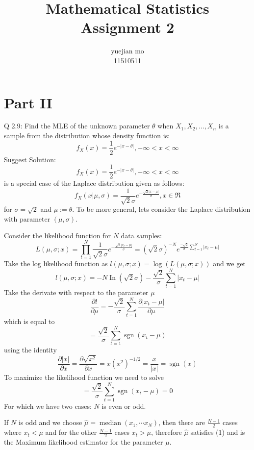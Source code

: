 \documentclass{article}
\newcommand{\assign}{:=}
\newcommand{\nobracket}{}
\newcommand{\tmaffiliation}[1]{\\ #1}
\newcommand{\tmop}[1]{\ensuremath{\operatorname{#1}}}
\begin{document}
\title{Mathematical Statistics Assignment 2}

\author{
  yuejian mo
  \tmaffiliation{11510511}
}

\maketitle

\section*{Part II}

Q 2.9: Find the MLE of the unknown parameter $\theta$ when $X_1, X_2, \ldots,
X_n$ is a sample from the distribution whose density function is:
\[ f_X (x) = \frac{1}{2} e^{- | x - \theta |}, - \infty < x < \infty \]
Suggest Solution:
\[ f_X (x) = \frac{1}{2} e^{- | x - \theta |}, - \infty < x < \infty \]
is a special case of the Laplace distribution given as follows:
\[ f_X (x | \mu, \sigma \nobracket) = \frac{1}{\sqrt{2} \sigma} e^{-
   \frac{\sqrt{2} | x - \mu |}{\sigma}}, x \in \Re \]
for $\sigma = \sqrt{2}$ and $\mu \assign \theta$. To be more general, lets
consider the Laplace distribution with parameter $(\mu, \sigma) .$

Consider the likelihood function for $N$ data samples:
\[ L (\mu, \sigma ; x) = \prod_{t = 1}^N \frac{1}{\sqrt{2} \sigma} e^{-
   \frac{\sqrt{2} | x_t - \mu |}{\sigma}} = \left( \sqrt{2} \sigma \right)^{-
   N} e^{\frac{- \sqrt{2}}{\sigma} \sum_{t = 1}^N | x_t - \mu |} \]
Take the log likelihood function as $l (\mu, \sigma ; x) = \log (L (\mu,
\sigma ; x))$ and we get
\[ l (\mu, \sigma ; x) = - N \tmop{In} \left( \sqrt{2} \sigma \right) -
   \frac{\sqrt{2}}{\sigma} \sum_{t = 1}^N | x_t - \mu | \]
Take the derivate with respect to the parameter $\mu$
\[ \frac{\partial l}{\partial \mu} = - \frac{\sqrt{2}}{\sigma} \sum_{t = 1}^N
   \frac{\partial | x_t - \mu |}{\partial \mu} \]
which is equal to
\[ = \frac{\sqrt{2}}{\sigma} \sum_{t = 1}^N \tmop{sgn} (x_t - \mu) \]
using the identity
\[ \frac{\partial | x |}{\partial x} = \frac{\partial \sqrt{x^2}}{\partial x}
   = x (x^2)^{- 1 / 2} = \frac{x}{| x |} = \tmop{sgn} (x) \]
To maximize the likelihood function we need to solve
\begin{equation}
  = \frac{\sqrt{2}}{\sigma} \sum_{t = 1}^N \tmop{sgn} (x_t - \mu) = 0
\end{equation}
For which we have two cases: $N$ is even or odd.

If $N$ is odd and we choose $\hat{\mu} = \tmop{median} (x_1, \cdots x_N)$,
then there are $\frac{N - 1}{2}$ cases where $x_t < \mu$ and for the other
$\frac{N - 1}{2}$ cases $x_t > \mu$, therefore $\hat{\mu}$ satisfies (1) and
is the Maximum likelihood estimator for the parameter $\mu$.
\end{document}
